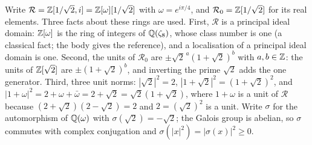 \documentclass[acmsmall,screen,review,anonymous,nonacm]{acmart}
\begin{document}
Write $\mathcal R = \mathbb{Z}[1/\sqrt2, i] = \mathbb{Z}[\omega][1/\sqrt2]$ with $\omega =
e^{i\pi/4}$, and $\mathcal R_0 = \mathbb{Z}[1/\sqrt2]$ for its real elements. Three
facts about these rings are used. First, $\mathcal R$ is a principal ideal
domain: $\mathbb{Z}[\omega]$ is the ring of integers of $\mathbb{Q}(\zeta_8)$, whose class
number is one (a classical fact; the body gives the reference), and a
localisation of a principal ideal domain is one. Second, the units of
$\mathcal R_0$ are $\pm\sqrt2^{\,a}(1+\sqrt2)^{b}$ with $a, b \in \mathbb{Z}$: the
units of $\mathbb{Z}[\sqrt2]$ are $\pm(1+\sqrt2)^{b}$, and inverting the prime
$\sqrt2$ adds the one generator. Third, three unit norms: $|\sqrt2|^{2} = 2$,
$|1+\sqrt2|^{2} = (1+\sqrt2)^{2}$, and $|1+\omega|^{2} = 2 + \omega +
\bar\omega = 2+\sqrt2 = \sqrt2(1+\sqrt2)$, where $1+\omega$ is a unit of
$\mathcal R$ because $(2+\sqrt2)(2-\sqrt2) = 2$ and $2 = (\sqrt2)^{2}$ is a
unit. Write $\sigma$ for the
automorphism of $\mathbb{Q}(\omega)$ with $\sigma(\sqrt2) = -\sqrt2$; the Galois
group is abelian, so $\sigma$ commutes with complex conjugation and
$\sigma(|x|^{2}) = |\sigma(x)|^{2} \ge 0$.

\stmtCliffordT
\end{document}
